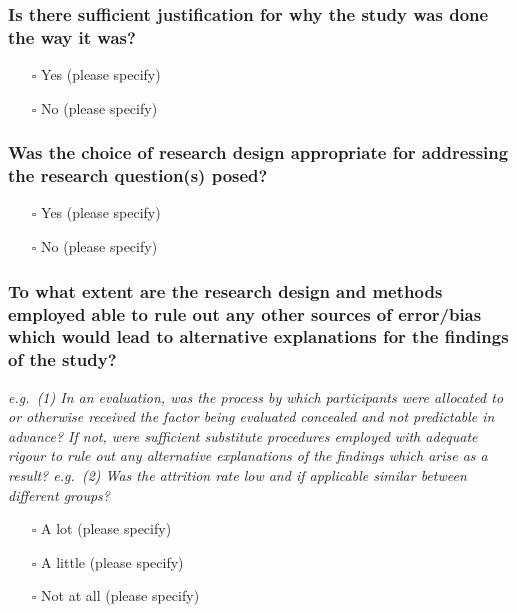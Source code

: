 \documentclass[
  doc, a4paper]{apa7}
\providecommand{\tightlist}{%
  \setlength{\itemsep}{0pt}\setlength{\parskip}{0pt}}
\begin{document}
\subsubsection{Is there sufficient justification for why the study was done the way it was?}\label{is-there-sufficient-justification-for-why-the-study-was-done-the-way-it-was}

\begin{itemize}
\tightlist
\item[$\square$]
  Yes (please specify)
\item[$\square$]
  No (please specify)
\end{itemize}

\subsubsection{Was the choice of research design appropriate for addressing the research question(s) posed?}\label{was-the-choice-of-research-design-appropriate-for-addressing-the-research-questions-posed}

\begin{itemize}
\tightlist
\item[$\square$]
  Yes (please specify)
\item[$\square$]
  No (please specify)
\end{itemize}

\subsubsection{To what extent are the research design and methods employed able to rule out any other sources of error/bias which would lead to alternative explanations for the findings of the study?}\label{to-what-extent-are-the-research-design-and-methods-employed-able-to-rule-out-any-other-sources-of-errorbias-which-would-lead-to-alternative-explanations-for-the-findings-of-the-study}

\emph{e.g.~(1) In an evaluation, was the process by which participants were allocated to or otherwise received the factor being evaluated concealed and not predictable in advance? If not, were sufficient substitute procedures employed with adequate rigour to rule out any alternative explanations of the findings which arise as a result? e.g.~(2) Was the attrition rate low and if applicable similar between different groups?}

\begin{itemize}
\tightlist
\item[$\square$]
  A lot (please specify)
\item[$\square$]
  A little (please specify)
\item[$\square$]
  Not at all (please specify)
\end{itemize}
\end{document}
